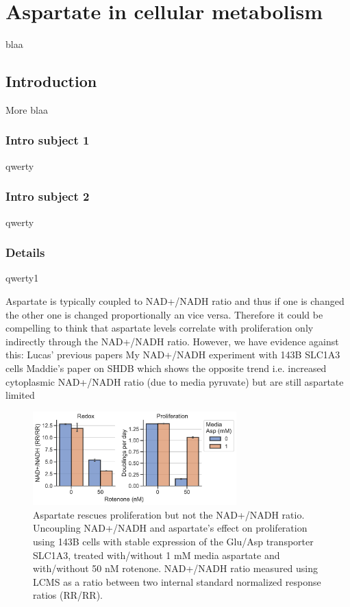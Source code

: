 \chapter{Aspartate in cellular metabolism}
blaa

\section{Introduction}
More blaa

\subsection{Intro subject 1}
qwerty

\subsection{Intro subject 2}
qwerty
\subsection{Details}
qwerty1




Aspartate is typically coupled to NAD+/NADH ratio and thus if one is changed the other one is changed proportionally an vice versa.
Therefore it could be compelling to think that aspartate levels correlate with proliferation only indirectly through the NAD+/NADH ratio.
However, we have evidence against this:
Lucas' previous papers
My NAD+/NADH experiment with 143B SLC1A3 cells
Maddie's paper on SHDB which shows the opposite trend i.e. increased cytoplasmic NAD+/NADH ratio (due to media pyruvate) but are still aspartate limited



\begin{figure}
    \centering
    \includegraphics[width=0.70\textwidth]{figures/chap1/redox-prlfr_uncpl.pdf}
    \caption[Aspartate rescues proliferation but not the NAD+/NADH ratio]{
    Aspartate rescues proliferation but not the NAD+/NADH ratio.
    Uncoupling NAD+/NADH and aspartate's effect on proliferation using 143B cells with stable expression of the Glu/Asp transporter SLC1A3, treated with/without 1 mM media aspartate and with/without 50 nM rotenone.
    NAD+/NADH ratio measured using LCMS as a ratio between two internal standard normalized response ratios (RR/RR).
    }
    \label{fig:ch1:redox-prlfr_uncpl}
\end{figure}





